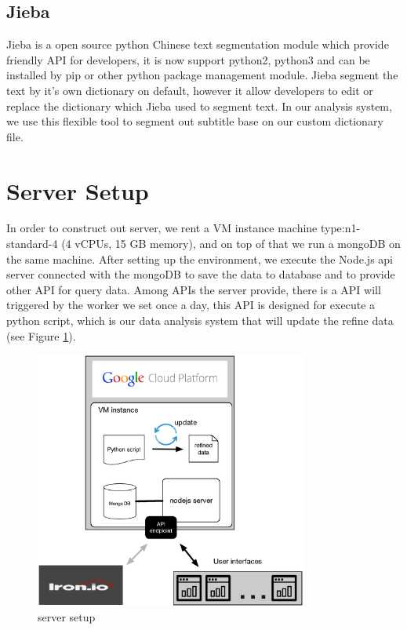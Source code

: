 \subsection{Jieba}
Jieba \cite{jieba} is a open source python Chinese text segmentation module which provide friendly API for developers, it is now support python2, python3 and can be installed by pip or other python package management module.
Jieba segment the text by it's own dictionary on default, however it allow developers to edit or replace the dictionary which Jieba used to segment text.
In our analysis system, we use this flexible tool to segment out subtitle base on our custom dictionary file.

\section{Server Setup}
In order to construct out server, we rent a VM instance machine type:n1-standard-4 (4 vCPUs, 15 GB memory), and on top of that we run a mongoDB on the same machine.
After setting up the environment, we execute the Node.js api server connected with the mongoDB to save the data to database and to provide other API for query data.
Among APIs the server provide, there is a API will triggered by the worker we set once a day, this API is designed for execute a python script, which is our data analysis system that will update the refine data (see Figure \ref{fig:serversetup}).
\begin{figure}[H]
    \centering
    \includegraphics[width = 0.8\textwidth]{fig/serversetup.eps}
    \caption{server setup}
    \label{fig:serversetup}
\end{figure}

